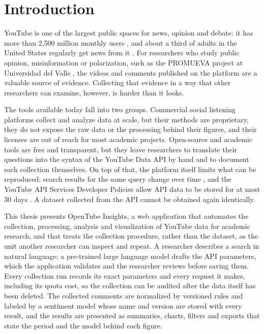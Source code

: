 \chapter{Introduction}
\label{chap:introduction}

YouTube is one of the largest public spaces for news, opinion and debate: it has more than 2,500 million monthly users \autocite{statista2025social}, and about a third of adults in the United States regularly get news from it \autocite{pewresearch2025social}. For researchers who study public opinion, misinformation or polarization, such as the PROMUEVA project at Universidad del Valle \autocite{promueva_project}, the videos and comments published on the platform are a valuable source of evidence. Collecting that evidence in a way that other researchers can examine, however, is harder than it looks.

The tools available today fall into two groups. Commercial social listening platforms collect and analyze data at scale, but their methods are proprietary, they do not expose the raw data or the processing behind their figures, and their licenses are out of reach for most academic projects. Open-source and academic tools are free and transparent, but they leave researchers to translate their questions into the syntax of the YouTube Data API by hand and to document each collection themselves. On top of that, the platform itself limits what can be reproduced: search results for the same query change over time \autocite{efstratiou2025youtube}, and the YouTube API Services Developer Policies allow API data to be stored for at most 30 days \autocite{youtube_api_services_developer_policies}. A dataset collected from the API cannot be obtained again identically.

This thesis presents OpenTube Insights, a web application that automates the collection, processing, analysis and visualization of YouTube data for academic research, and that treats the collection procedure, rather than the dataset, as the unit another researcher can inspect and repeat. A researcher describes a search in natural language; a pre-trained large language model drafts the API parameters, which the application validates and the researcher reviews before saving them. Every collection run records its exact parameters and every request it makes, including its quota cost, so the collection can be audited after the data itself has been deleted. The collected comments are normalized by versioned rules and labeled by a sentiment model whose name and version are stored with every result, and the results are presented as summaries, charts, filters and exports that state the period and the model behind each figure.


